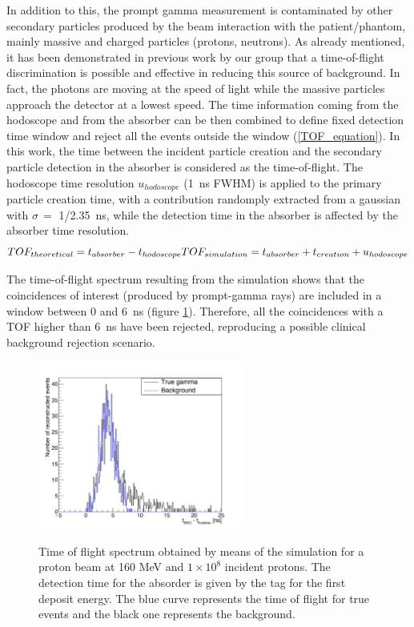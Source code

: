 In addition to this, the prompt gamma measurement is contaminated by other secondary particles produced by the beam interaction with the patient/phantom, mainly massive and charged particles (protons, neutrons). 
As already mentioned, it has been demonstrated in previous work by our group that a time-of-flight discrimination is possible and effective in reducing this source of background. In fact, the photons are moving at the speed of light while the massive particles approach the detector at a lowest speed. The time information coming from the hodoscope and from the absorber can be then combined to define fixed detection time window and reject all the events outside the window (\ref{TOF_equation}). In this work, the time between the incident particle creation and the secondary particle detection in the absorber is considered as the time-of-flight. The hodoscope time resolution $u_{hodoscope}$ (1~ns FWHM) is applied to the primary particle creation time, with a contribution randomply extracted from a gaussian with $\sigma\,=$ 1/2.35~ns, while the detection time in the absorber is affected by the absorber time resolution.\\
\begin{equation}
TOF_{theoretical} = t_{absorber}-t_{hodoscope} \\
TOF_{simulation} = t_{absorber}+t_{creation} + u_{hodoscope}
\label{TOF_equation}
\end{equation} 

The time-of-flight spectrum resulting from the simulation shows that the coincidences of interest (produced by prompt-gamma rays) are included in a window between 0 and 6~ns (figure \ref{fig:fig_TOF_distribution_CC_simulation_Hadronth}). Therefore, all the coincidences with a TOF higher than 6~ns have been rejected, reproducing a possible clinical background rejection scenario. 

	\begin{figure} [!hbtp]	
	\centering
	\caption{Time of flight spectrum obtained by means of the simulation for a proton beam at 160 MeV and $1\times10^{8}$ incident protons. The detection time for the absorder is given by the tag for the first deposit energy. The blue curve represents the time of flight for true events and the black one represents the background.}	
	\includegraphics[width=0.6\textwidth]{./Figure/2015_01_04_TOF_spectra_NoCut_1Proton_ResolTemporelle_applied_these.jpg}
	\label{fig:fig_TOF_distribution_CC_simulation_Hadronth}
	\end{figure}

